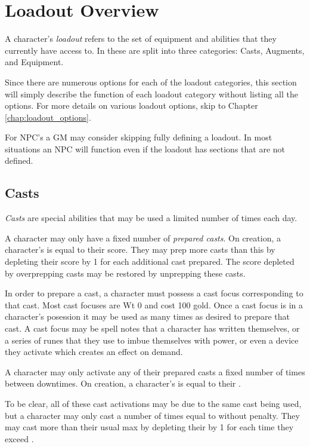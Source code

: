 \section{Loadout Overview}

A character's \emph{loadout} refers to the set of equipment and abilities that they currently have access to. In \GammaRP{} these are split into three categories: Casts, Augments, and Equipment.

Since there are numerous options for each of the loadout categories, this section will simply describe the function of each loadout category without listing all the options. For more details on various loadout options, skip to Chapter \ref{chap:loadout_options}.

For NPC's a GM may consider skipping fully defining a loadout. In most situations an NPC will function even if the loadout has sections that are not defined.

\subsection{Casts}

\emph{Casts} are special abilities that may be used a limited number of times each day.

A character may only have a fixed number of \emph{prepared casts}. On creation, a character's  is equal to their  score. They may prep more casts than this by depleting their  score by 1 for each additional cast prepared. The  score depleted by overprepping casts may be restored by unprepping these casts.

In order to prepare a cast, a character must possess a cast focus corresponding to that cast. Most cast focuses are Wt 0 and cost 100 gold. Once a cast focus is in a character's posession it may be used as many times as desired to prepare that cast. A cast focus may be spell notes that a character has written themselves, or a series of runes that they use to imbue themselves with power, or even a device they activate which creates an effect on demand.

A character may only activate any of their prepared casts a fixed number of times between downtimes. On creation, a character's  is equal to their . 

To be clear, all of these cast activations may be due to the same cast being used, but a character may only cast a number of times equal to  without penalty. They may cast more than their usual max by depleting their  by 1 for each time they exceed .

